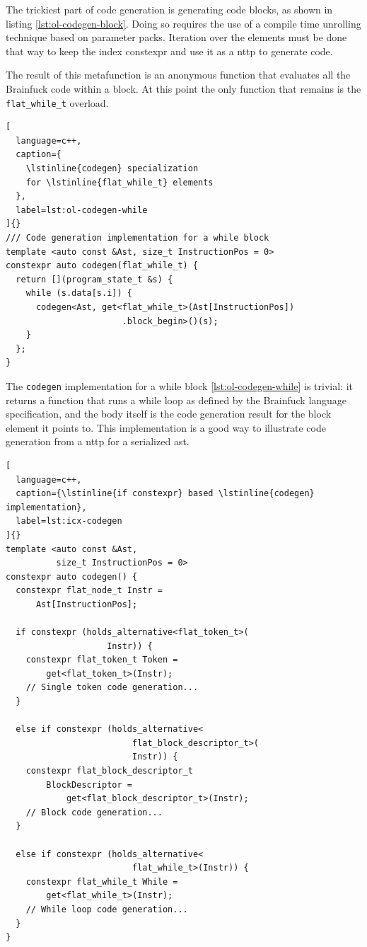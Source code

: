 \documentclass[../main]{subfiles}
\begin{document}
The trickiest part of code generation is generating code blocks, as shown in
listing \ref{lst:ol-codegen-block}. Doing so requires the use of a compile time
unrolling technique based on \cpp parameter packs.
Iteration over the elements must be done that way to keep the index
\gls{constexpr} and use it as a \gls{nttp} to generate code.

The result of this metafunction is an anonymous function that evaluates all the
Brainfuck code within a block. At this point the only function that remains
is the \lstinline{flat_while_t} overload.

\begin{lstlisting}[
  language=c++,
  caption={
    \lstinline{codegen} specialization
    for \lstinline{flat_while_t} elements
  },
  label=lst:ol-codegen-while
]{}
/// Code generation implementation for a while block
template <auto const &Ast, size_t InstructionPos = 0>
constexpr auto codegen(flat_while_t) {
  return [](program_state_t &s) {
    while (s.data[s.i]) {
      codegen<Ast, get<flat_while_t>(Ast[InstructionPos])
                       .block_begin>()(s);
    }
  };
}
\end{lstlisting}

The \lstinline{codegen} implementation for a while block
\ref{lst:ol-codegen-while} is trivial: it returns a function that runs a while
loop as defined by the Brainfuck language specification, and the body itself is
the code generation result for the block element it points to.
This implementation is a good way to illustrate code generation from a
\gls{nttp} for a serialized \gls{ast}.

\begin{lstlisting}[
  language=c++,
  caption={\lstinline{if constexpr} based \lstinline{codegen} implementation},
  label=lst:icx-codegen
]{}
template <auto const &Ast,
          size_t InstructionPos = 0>
constexpr auto codegen() {
  constexpr flat_node_t Instr =
      Ast[InstructionPos];

  if constexpr (holds_alternative<flat_token_t>(
                    Instr)) {
    constexpr flat_token_t Token =
        get<flat_token_t>(Instr);
    // Single token code generation...
  }

  else if constexpr (holds_alternative<
                         flat_block_descriptor_t>(
                         Instr)) {
    constexpr flat_block_descriptor_t
        BlockDescriptor =
            get<flat_block_descriptor_t>(Instr);
    // Block code generation...
  }

  else if constexpr (holds_alternative<
                         flat_while_t>(Instr)) {
    constexpr flat_while_t While =
        get<flat_while_t>(Instr);
    // While loop code generation...
  }
}
\end{lstlisting}
\end{document}
